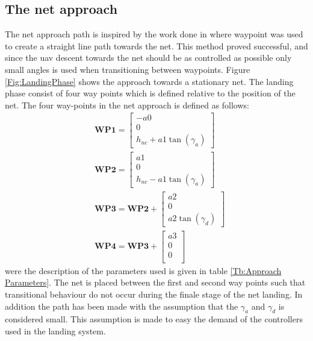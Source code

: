 \subsection{The net approach}\label{SS:netApproach}
The net approach path is inspired by the work done in \citep{Skulstad&Syversen} where waypoint was used to create a straight line path towards the net. This method proved successful, and since the \gls{uav} descent towards the net should be as controlled as possible only small angles is used when transitioning between waypoints. Figure \ref{Fig:LandingPhase} shows the approach towards a stationary net. The landing phase consist of four way points which is defined relative to the position of the net. The four way-points in the net approach is defined as follows:
\begin{subequations}
\begin{align}
&\mathbf{WP1} = 
\begin{bmatrix}
-a0 \\
0 \\
h_{nc} + a1\tan(\gamma_a) 
\end{bmatrix}\\
&\mathbf{WP2} = 
\begin{bmatrix}
a1 \\
0 \\
h_{nc} - a1\tan(\gamma_a)
\end{bmatrix}\\
&\mathbf{WP3} = \mathbf{WP2} + 
\begin{bmatrix}
a2 \\
0 \\
a2\tan(\gamma_d)
\end{bmatrix}\\
&\mathbf{WP4} = \mathbf{WP3} + 
\begin{bmatrix}
a3 \\
0 \\
0 \\
\end{bmatrix}
\end{align}
\end{subequations}
were the description of the parameters used is given in table \ref{Tb:Approach Parameters}. The net is placed between the first and second way points such that transitional behaviour do not occur during the finale stage of the net landing. In addition the path has been made with the assumption that the $\gamma_a$ and $\gamma_d$ is considered small. This assumption is made to easy the demand of the controllers used in the landing system.
